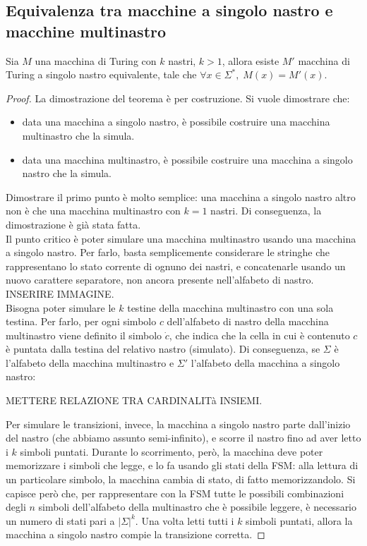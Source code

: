 \subsection*{Equivalenza tra macchine a singolo nastro e macchine multinastro}
\begin{thm}
    Sia $M$ una macchina di Turing con $k$ nastri, $k>1$, allora esiste $M'$
    macchina di Turing a singolo nastro equivalente, tale che
    $\forall x \in \Sigma^*, \; M(x) = M'(x)$.
\end{thm}

\begin{proof}
    La dimostrazione del teorema è per costruzione. Si vuole dimostrare che:
    \begin{itemize}
        \item data una macchina a singolo nastro, è possibile costruire una
        macchina multinastro che la simula.
        \item data una macchina multinastro, è possibile costruire una
        macchina a singolo nastro che la simula.
    \end{itemize}
    Dimostrare il primo punto è molto semplice: una macchina a singolo nastro
    altro non è che una macchina multinastro con $k = 1$ nastri.
    Di conseguenza, la dimostrazione è già stata fatta.\\
    Il punto critico è poter simulare una macchina multinastro usando una
    macchina a singolo nastro.
    Per farlo, basta semplicemente considerare le stringhe che rappresentano
    lo stato corrente di ognuno dei nastri, e concatenarle usando un nuovo
    carattere separatore, non ancora presente nell'alfabeto di nastro.\\
        INSERIRE IMMAGINE.\\
    Bisogna poter simulare le $k$ testine della macchina multinastro con una
    sola testina. Per farlo, per ogni simbolo $c$ dell'alfabeto di nastro
    della macchina multinastro viene definito il simbolo $\dot{c}$, che
    indica che la cella in cui è contenuto $c$ è puntata dalla testina del
    relativo nastro (simulato).
    Di conseguenza, se $\Sigma$ è l'alfabeto della macchina multinastro e
    $\Sigma'$ l'alfabeto della macchina a singolo nastro:
    \begin{center}
        METTERE RELAZIONE TRA CARDINALITà INSIEMI.
    \end{center}
    Per simulare le transizioni, invece, la macchina a singolo nastro parte
    dall'inizio del nastro (che abbiamo assunto semi-infinito), e scorre il
    nastro fino ad aver letto i $k$ simboli puntati. Durante lo scorrimento,
    però, la macchina deve poter memorizzare i simboli che legge, e lo fa
    usando gli stati della FSM: alla lettura di un particolare simbolo, la
    macchina cambia di stato, di fatto memorizzandolo. Si capisce però che, per
    rappresentare con la FSM tutte le possibili combinazioni degli $n$
    simboli dell'alfabeto della multinastro che è possibile leggere, è
    necessario un numero di stati pari a $|\Sigma|^k$.
    Una volta letti tutti i $k$ simboli puntati, allora la macchina a singolo
    nastro compie la transizione corretta.
\end{proof}

